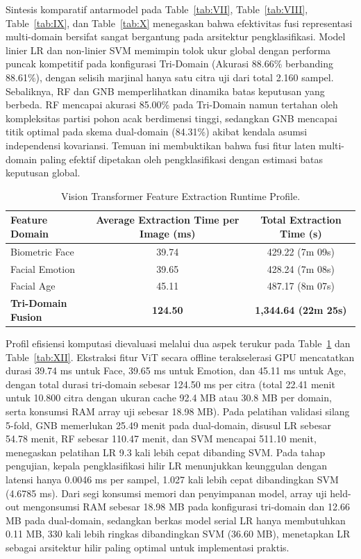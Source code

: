 Sintesis komparatif antarmodel pada Table~\ref{tab:VII}, Table~\ref{tab:VIII}, Table~\ref{tab:IX}, dan Table~\ref{tab:X} menegaskan bahwa efektivitas fusi representasi multi-domain bersifat sangat bergantung pada arsitektur pengklasifikasi. Model linier LR dan non-linier SVM memimpin tolok ukur global dengan performa puncak kompetitif pada konfigurasi Tri-Domain (Akurasi 88.66\% berbanding 88.61\%), dengan selisih marjinal hanya satu citra uji dari total 2.160 sampel. Sebaliknya, RF dan GNB memperlihatkan dinamika batas keputusan yang berbeda. RF mencapai akurasi 85.00\% pada Tri-Domain namun tertahan oleh kompleksitas partisi pohon acak berdimensi tinggi, sedangkan GNB mencapai titik optimal pada skema dual-domain (84.31\%) akibat kendala asumsi independensi kovariansi. Temuan ini membuktikan bahwa fusi fitur laten multi-domain paling efektif dipetakan oleh pengklasifikasi dengan estimasi batas keputusan global.

\begin{table}[htbp]
\caption{Vision Transformer Feature Extraction Runtime Profile.}
\label{tab:11}
\label{tab:XI}
\centering
\footnotesize
\setlength{\tabcolsep}{6pt}
\begin{tabular}{lcc}
\toprule
\textbf{Feature Domain} & \textbf{Average Extraction Time per Image (ms)} & \textbf{Total Extraction Time (s)} \\
\midrule
Biometric Face & 39.74 & 429.22 (7m 09s) \\
Facial Emotion & 39.65 & 428.24 (7m 08s) \\
Facial Age & 45.11 & 487.17 (8m 07s) \\
\midrule
\textbf{Tri-Domain Fusion} & \textbf{124.50} & \textbf{1,344.64 (22m 25s)} \\
\bottomrule
\end{tabular}
\end{table}

Profil efisiensi komputasi dievaluasi melalui dua aspek terukur pada Table~\ref{tab:XI} dan Table~\ref{tab:XII}. Ekstraksi fitur ViT secara offline terakselerasi GPU mencatatkan durasi 39.74 ms untuk Face, 39.65 ms untuk Emotion, dan 45.11 ms untuk Age, dengan total durasi tri-domain sebesar 124.50 ms per citra (total 22.41 menit untuk 10.800 citra dengan ukuran cache 92.4 MB atau 30.8 MB per domain, serta konsumsi RAM array uji sebesar 18.98 MB). Pada pelatihan validasi silang 5-fold, GNB memerlukan 25.49 menit pada dual-domain, disusul LR sebesar 54.78 menit, RF sebesar 110.47 menit, dan SVM mencapai 511.10 menit, menegaskan pelatihan LR 9.3 kali lebih cepat dibanding SVM. Pada tahap pengujian, kepala pengklasifikasi hilir LR menunjukkan keunggulan dengan latensi hanya 0.0046 ms per sampel, 1.027 kali lebih cepat dibandingkan SVM (4.6785 ms). Dari segi konsumsi memori dan penyimpanan model, array uji held-out mengonsumsi RAM sebesar 18.98 MB pada konfigurasi tri-domain dan 12.66 MB pada dual-domain, sedangkan berkas model serial LR hanya membutuhkan 0.11 MB, 330 kali lebih ringkas dibandingkan SVM (36.60 MB), menetapkan LR sebagai arsitektur hilir paling optimal untuk implementasi praktis.

